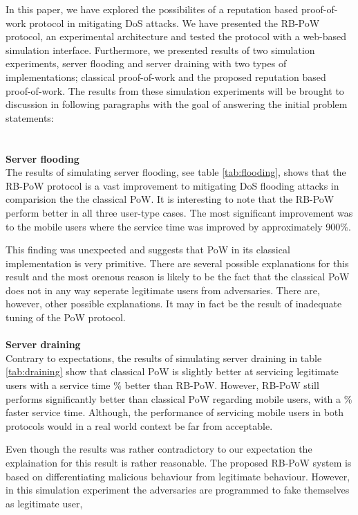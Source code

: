 In this paper, we have explored the possibilites of a reputation based proof-of-work protocol in mitigating DoS attacks. We have presented the RB-PoW protocol, an experimental architecture and tested the protocol with a web-based simulation interface. Furthermore, we presented results of two simulation experiments, server flooding and server draining with two types of implementations; classical proof-of-work and the proposed reputation based proof-of-work. The results from these simulation experiments will be brought to discussion in following paragraphs with the goal of answering the initial problem statements:
\\
\\
\\
\textbf{Server flooding}
\vspace{7pt}
\\
The results of simulating server flooding, see table \ref{tab:flooding}, shows that the RB-PoW protocol is a vast improvement to mitigating DoS flooding attacks in comparision the the classical PoW. It is interesting to note that the RB-PoW perform better in all three user-type cases. The most significant improvement was to the mobile users where the service time was improved by approximately 900\%. 

This finding was unexpected and suggests that PoW in its classical implementation is very primitive.
There are several possible explanations for this result and the most orenous reason is likely to be the fact that the classical PoW does not in any way seperate legitimate users from adversaries.
There are, however, other possible explanations. It may in fact be the result of inadequate tuning of the PoW protocol. 
\\
\\
\textbf{Server draining}
\vspace{7pt}
\\
Contrary to expectations, the results of simulating server draining in table \ref{tab:draining} show that classical PoW is slightly better at servicing legitimate users with a service time \% better than RB-PoW. However, RB-PoW still performs significantly better than classical PoW regarding mobile users, with a \% faster service time. Although, the performance of servicing mobile users in both protocols would in a real world context be far from acceptable.

Even though the results was rather contradictory to our expectation the explaination for this result is rather reasonable. The proposed RB-PoW system is based on differentiating malicious behaviour from legitimate behaviour. However, in this simulation experiment the adversaries are programmed to fake themselves as legitimate user,  




